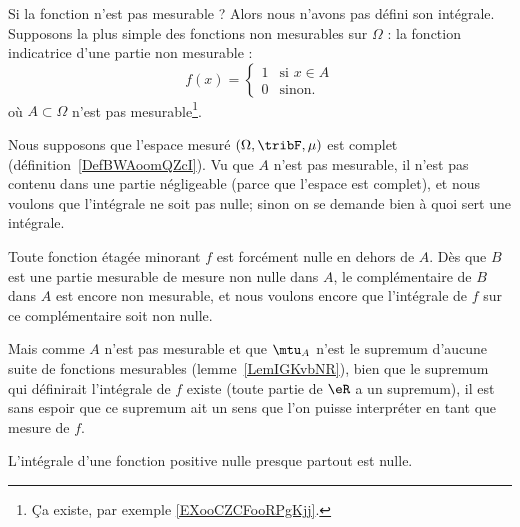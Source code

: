\begin{normaltext}      \label{NORMooXTGBooKDnAhZ}
	Si la fonction n'est pas mesurable ? Alors nous n'avons pas défini son intégrale. Supposons la plus simple des fonctions non mesurables sur \( \Omega\) : la fonction indicatrice d'une partie non mesurable :
	\begin{equation}
		f(x)=\begin{cases}
			1 & \text{si } x\in A \\
			0 & \text{sinon. }
		\end{cases}
	\end{equation}
	où \( A\subset \Omega\) n'est pas mesurable\footnote{Ça existe, par exemple \ref{EXooCZCFooRPgKjj}.}.

	Nous supposons que l'espace mesuré \( (\Omega,\tribF,\mu)\) est complet (définition~\ref{DefBWAoomQZcI}). Vu que \( A\) n'est pas mesurable, il n'est pas contenu dans une partie négligeable (parce que l'espace est complet), et nous voulons que l'intégrale ne soit pas nulle; sinon on se demande bien à quoi sert une intégrale.

	Toute fonction étagée minorant \( f\) est forcément nulle en dehors de \( A\). Dès que \( B\) est une partie mesurable de mesure non nulle dans \( A\), le complémentaire de \( B\) dans \( A\) est encore non mesurable, et nous voulons encore que l'intégrale de \( f\) sur ce complémentaire soit non nulle.

	Mais comme \( A\) n'est pas mesurable et que \( \mtu_A\) n'est le supremum d'aucune suite de fonctions mesurables (lemme~\ref{LemIGKvbNR}), bien que le supremum qui définirait l'intégrale de \( f\) existe (toute partie de \( \eR\) a un supremum), il est sans espoir que ce supremum ait un sens que l'on puisse interpréter en tant que mesure de \( f\).
\end{normaltext}

\begin{lemma}  \label{LEMooHAUGooWITETb}
	L'intégrale d'une fonction positive nulle presque partout est nulle.
\end{lemma}

